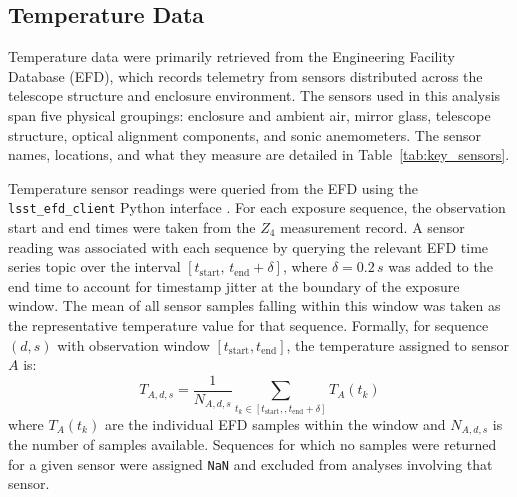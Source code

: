 \documentclass[SE,authoryear,toc]{lsstdoc}
\begin{document}
\subsection{Temperature Data}
\label{subsec:Temp Sensors}
Temperature data were primarily retrieved from the Engineering Facility Database (EFD), which records telemetry from sensors distributed across the telescope structure and enclosure 
environment. The sensors used in this analysis span five physical 
groupings: enclosure and ambient air, mirror glass, telescope structure, optical alignment components, and sonic anemometers. The sensor names, locations, and what they measure are detailed in Table~\ref{tab:key_sensors}.

Temperature sensor readings were queried from the EFD using the \texttt{lsst\_efd\_client} Python interface \citep{lsst_efd_client}. For each exposure sequence, the observation start and end times were taken from the $Z_4$ measurement record. A sensor reading was associated with each sequence by querying the relevant EFD time series topic over the interval $[t_\text{start},\, t_\text{end} + \delta]$, where $\delta = 0.2\,s$ was added to the end time to account for timestamp jitter at the boundary of the exposure window. The mean of all sensor samples falling within this window was taken as the representative temperature value for that sequence.
Formally, for sequence $(d, s)$ with observation window $[t_\text{start}, t_\text{end}]$, the temperature assigned to sensor $A$ is:
\begin{equation}
T_{A,d,s} = \frac{1}{N_{A,d,s}} \sum_{t_k \in [t_\text{start},, t_\text{end} + \delta]} T_A(t_k)
\end{equation}
where $ T_A(t_k)$ are the individual EFD samples within the window and $N_{A,d,s}$ is the number of samples available. Sequences for which no samples were returned for a given sensor were assigned \texttt{NaN} and excluded from analyses involving that sensor.
\end{document}
